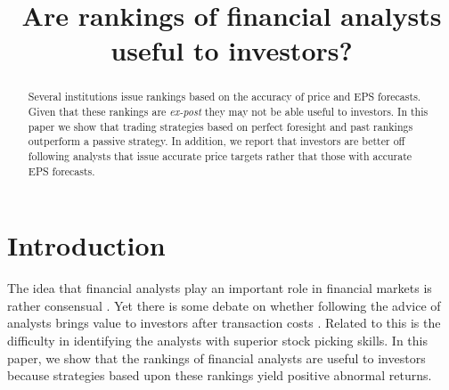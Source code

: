 \documentclass{article}\usepackage[]{graphicx}\usepackage[]{color}
\begin{document}
\title{Are rankings of financial analysts useful to investors?}
% 


\maketitle

\begin{abstract}
Several institutions issue rankings based on the accuracy of price and EPS forecasts. Given that these rankings are \textit{ex-post} they may not be able useful to investors. In this paper  we show that trading strategies based on perfect foresight and past rankings outperform a passive strategy.  In addition, we report that investors are better off following analysts that issue  accurate price targets rather that those with accurate EPS forecasts. 
\end{abstract}

\section{Introduction}
\label{sec:intro}

The idea that financial analysts play an important role in financial markets is rather consensual \citep{cowles1933csm,obrien1990}. Yet there is some debate on whether following the advice of analysts brings value to investors after transaction costs \citep{womack1996,mikhail2004sae,li2005persistence}. Related to this is the difficulty in identifying the analysts with superior stock picking skills. In this paper, we show that the rankings of financial analysts are useful to investors because strategies based upon these rankings yield positive abnormal returns.
\end{document}
